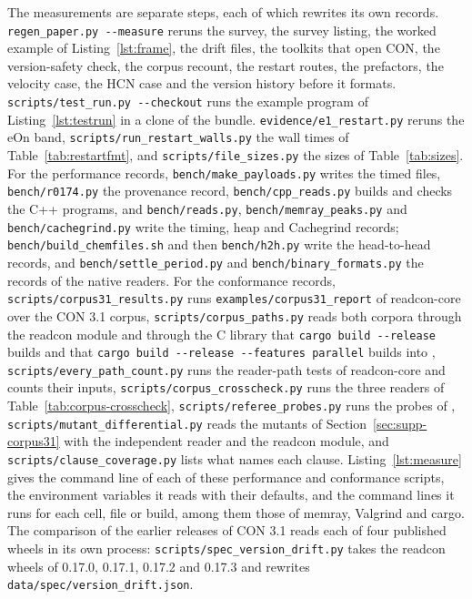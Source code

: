 \documentclass[preprint,12pt]{elsarticle}
\begin{document}
The measurements are separate steps, each of which rewrites its own records.
\texttt{regen\_paper.py -{}-measure} reruns the survey, the survey listing, the worked example of Listing~\ref{lst:frame}, the drift files, the toolkits that open CON, the version-safety check, the corpus recount, the restart routes, the prefactors, the velocity case, the HCN case and the version history before it formats.
\texttt{scripts/\allowbreak test\_run.py -{}-checkout} runs the example program of Listing~\ref{lst:testrun} in a clone of the bundle.
\texttt{evidence/\allowbreak e1\_restart.py} reruns the eOn band, \texttt{scripts/\allowbreak run\_restart\_walls.py} the wall times of Table~\ref{tab:restartfmt}, and \texttt{scripts/\allowbreak file\_sizes.py} the sizes of Table~\ref{tab:sizes}.
For the performance records, \texttt{bench/\allowbreak make\_payloads.py} writes the timed files, \texttt{bench/\allowbreak r0174.py} the provenance record, \texttt{bench/\allowbreak cpp\_reads.py} builds and checks the C++ programs, and \texttt{bench/\allowbreak reads.py}, \texttt{bench/\allowbreak memray\_peaks.py} and \texttt{bench/\allowbreak cachegrind.py} write the timing, heap and Cachegrind records; \texttt{bench/\allowbreak build\_chemfiles.sh} and then \texttt{bench/\allowbreak h2h.py} write the head-to-head records, and \texttt{bench/\allowbreak settle\_period.py} and \texttt{bench/\allowbreak binary\_formats.py} the records of the native readers.
For the conformance records, \texttt{scripts/\allowbreak corpus31\_results.py} runs \texttt{examples/\allowbreak corpus31\_report} of readcon-core over the CON 3.1 corpus, \texttt{scripts/\allowbreak corpus\_paths.py} reads both corpora through the readcon module and through the C library that \texttt{cargo build -{}-release} builds and that \texttt{cargo build -{}-release -{}-features parallel} builds into , \texttt{scripts/\allowbreak every\_path\_count.py} runs the reader-path tests of readcon-core and counts their inputs, \texttt{scripts/\allowbreak corpus\_crosscheck.py} runs the three readers of Table~\ref{tab:corpus-crosscheck}, \texttt{scripts/\allowbreak referee\_probes.py} runs the probes of , \texttt{scripts/\allowbreak mutant\_differential.py} reads the mutants of Section~\ref{sec:supp-corpus31} with the independent reader and the readcon module, and \texttt{scripts/\allowbreak clause\_coverage.py} lists what names each clause.
Listing~\ref{lst:measure} gives the command line of each of these performance and conformance scripts, the environment variables it reads with their defaults, and the command lines it runs for each cell, file or build, among them those of memray, Valgrind and cargo.
The comparison of the earlier releases of CON 3.1 reads each of four published wheels in its own process: \texttt{scripts/\allowbreak spec\_version\_drift.py} takes the readcon wheels of 0.17.0, 0.17.1, 0.17.2 and 0.17.3 and rewrites \texttt{data/\allowbreak spec/\allowbreak version\_drift.json}.
\end{document}
